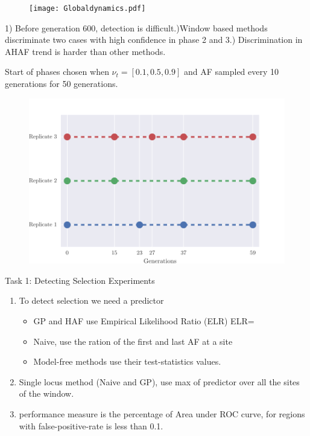 \documentclass[t]{beamer} %
\begin{document}
\begin{figure}[H]
  \centering
  		    \texttt{[image: Globaldynamics.pdf]}
\end{figure}
{\tiny 1) Before generation 600, detection is difficult.)Window based methods discriminate two cases with high confidence in phase 2 and 3.) Discrimination in AHAF trend is harder than other methods.}

{\tiny Start of phases chosen when $\nu_t=[0.1,0.5,0.9]$ and AF sampled every 10 generations for 50 generations.}
\begin{figure}
\hspace{-0in}\includegraphics[scale=0.16]{samplingTimes}
\end{figure}
\vspace{-0.5in}



\begin{frame}{Task 1: Detecting Selection Experiments}
\begin{enumerate}[I]
\item To detect selection we need a predictor
\begin{itemize}
\item GP and HAF use Empirical Likelihood Ratio (ELR)
\beqq
ELR=
\eeqq
\item Naive, use the ration of the first and last AF at a site
\item Model-free methods use their test-statistics values.
\end{itemize}
\item Single locus method (Naive and GP), use max of predictor over all the sites of the window.
\item performance measure is the percentage of Area under ROC curve, for regions with false-positive-rate is less than 0.1.
\end{enumerate}
\end{frame}
\end{document}
